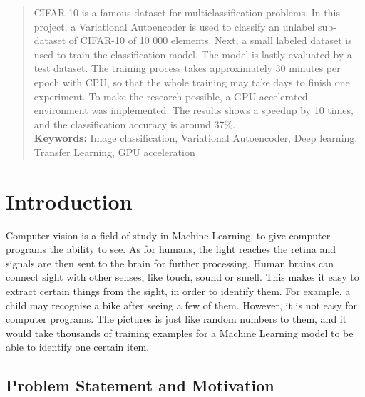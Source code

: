 \documentclass[11pt,a4paper]{report}
\begin{document}
\begin{abstract}




CIFAR-10 is a famous dataset for multiclassification problems. In this project, a Variational Autoencoder is used to classify an unlabel sub-dataset of CIFAR-10 of 10 000 elements. Next, a small labeled dataset is used to train the classification model. The model is lastly evaluated by a test dataset. The training process takes approximately 30 minutes per epoch with CPU, so that the whole training may take days to finish one experiment. To make the research possible, a GPU accelerated environment was implemented. The results shows a speedup by 10 times, and the classification accuracy is around 37\%. \\

\textbf{Keywords:} Image classification, Variational Autoencoder, Deep learning, Transfer Learning, GPU acceleration


\end{abstract}


\tableofcontents
\glsaddall
\printglossary[type=\acronymtype]
\printglossary[type=main,title={Glossary},toctitle={Glossary}]

\chapter{Introduction}
\label{chap:introduction}

Computer vision is a field of study in Machine Learning, to give computer programs the ability to see. As for humans, the light reaches the retina and signals are then sent to the brain for further processing. Human brains can connect sight with other senses, like touch, sound or smell. This makes it easy to extract certain things from the sight, in order to identify them. For example, a child may recognise a bike after seeing a few of them. However, it is not easy for computer programs. The pictures is just like random numbers to them, and it would take thousands of training examples for a Machine Learning model to be able to identify one certain item.


\section{Problem Statement and Motivation}
\label{sec:motivation}
\end{document}
